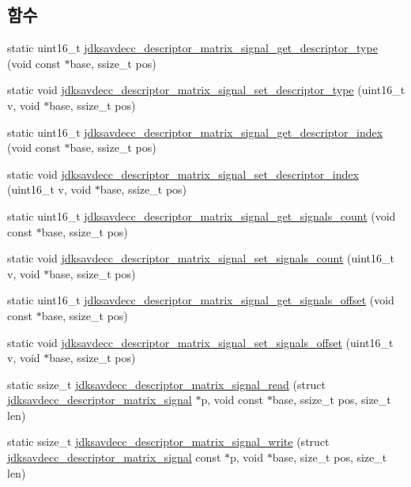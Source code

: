 \subsection*{함수}
\begin{DoxyCompactItemize}
\item 
static uint16\+\_\+t \hyperlink{group__descriptor__matrix__signal_ga82eac98c48c280448fe9fc8741492df6}{jdksavdecc\+\_\+descriptor\+\_\+matrix\+\_\+signal\+\_\+get\+\_\+descriptor\+\_\+type} (void const $\ast$base, ssize\+\_\+t pos)
\item 
static void \hyperlink{group__descriptor__matrix__signal_ga810dfab95cdbd7f8a54a45f665d4fadf}{jdksavdecc\+\_\+descriptor\+\_\+matrix\+\_\+signal\+\_\+set\+\_\+descriptor\+\_\+type} (uint16\+\_\+t v, void $\ast$base, ssize\+\_\+t pos)
\item 
static uint16\+\_\+t \hyperlink{group__descriptor__matrix__signal_ga71631c6c15a97fa8bbd6037574816b22}{jdksavdecc\+\_\+descriptor\+\_\+matrix\+\_\+signal\+\_\+get\+\_\+descriptor\+\_\+index} (void const $\ast$base, ssize\+\_\+t pos)
\item 
static void \hyperlink{group__descriptor__matrix__signal_gaf0da27eefdf8c74a0fbeef690170032e}{jdksavdecc\+\_\+descriptor\+\_\+matrix\+\_\+signal\+\_\+set\+\_\+descriptor\+\_\+index} (uint16\+\_\+t v, void $\ast$base, ssize\+\_\+t pos)
\item 
static uint16\+\_\+t \hyperlink{group__descriptor__matrix__signal_ga2c1281595390366b6d468d977235086d}{jdksavdecc\+\_\+descriptor\+\_\+matrix\+\_\+signal\+\_\+get\+\_\+signals\+\_\+count} (void const $\ast$base, ssize\+\_\+t pos)
\item 
static void \hyperlink{group__descriptor__matrix__signal_ga65ec57d6454b78ef0a416759e11f28b0}{jdksavdecc\+\_\+descriptor\+\_\+matrix\+\_\+signal\+\_\+set\+\_\+signals\+\_\+count} (uint16\+\_\+t v, void $\ast$base, ssize\+\_\+t pos)
\item 
static uint16\+\_\+t \hyperlink{group__descriptor__matrix__signal_ga3c4b995934488591a96dc28b7e68810a}{jdksavdecc\+\_\+descriptor\+\_\+matrix\+\_\+signal\+\_\+get\+\_\+signals\+\_\+offset} (void const $\ast$base, ssize\+\_\+t pos)
\item 
static void \hyperlink{group__descriptor__matrix__signal_ga46e1fb7ce57bdf53e8dadcd82dab3e04}{jdksavdecc\+\_\+descriptor\+\_\+matrix\+\_\+signal\+\_\+set\+\_\+signals\+\_\+offset} (uint16\+\_\+t v, void $\ast$base, ssize\+\_\+t pos)
\item 
static ssize\+\_\+t \hyperlink{group__descriptor__matrix__signal_ga2ebfbd17f0a3993c1efa824f3a8faf1a}{jdksavdecc\+\_\+descriptor\+\_\+matrix\+\_\+signal\+\_\+read} (struct \hyperlink{structjdksavdecc__descriptor__matrix__signal}{jdksavdecc\+\_\+descriptor\+\_\+matrix\+\_\+signal} $\ast$p, void const $\ast$base, ssize\+\_\+t pos, size\+\_\+t len)
\item 
static ssize\+\_\+t \hyperlink{group__descriptor__matrix__signal_ga76af29ea723d0c6bdc678c35a0c9056e}{jdksavdecc\+\_\+descriptor\+\_\+matrix\+\_\+signal\+\_\+write} (struct \hyperlink{structjdksavdecc__descriptor__matrix__signal}{jdksavdecc\+\_\+descriptor\+\_\+matrix\+\_\+signal} const $\ast$p, void $\ast$base, size\+\_\+t pos, size\+\_\+t len)
\end{DoxyCompactItemize}


